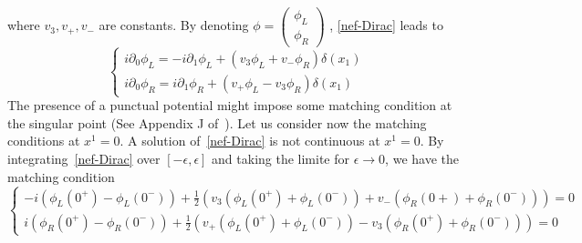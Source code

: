 where $v_3, v_+, v_-$ are constants.
By denoting $\phi =
\begin{pmatrix}
\phi_L \\
\phi_R
\end{pmatrix}$
, \cref{nef-Dirac} leads to
\begin{equation}
\begin{cases}
i \partial_0 \phi_L = -i\partial_1 \phi_L + (v_3 \phi_L + v_- \phi_R) \delta(x_1) \\
i \partial_0 \phi_R = i\partial_1 \phi_R + (v_+ \phi_L - v_3 \phi_R) \delta(x_1)
\end{cases}
\end{equation}
The presence of a punctual potential might impose some matching condition at the singular point (See \eg Appendix J of~\cite{albeverio1988solvable}).
Let us consider now the matching conditions at $x^1=0$.
A solution of~\cref{nef-Dirac} is not continuous at $x^1 = 0$. 
By integrating~\cref{nef-Dirac} over $[-\epsilon, \epsilon]$ and taking the limite for $\epsilon \rightarrow 0$,
we have the matching condition
\begin{equation}\label{nef-matching}
\begin{cases}
-i(\phi_L(0^+) - \phi_L(0^-)) + \frac{1}{2}(v_3 (\phi_L(0^+) + \phi_L(0^-))+ v_- (\phi_R(0+) + \phi_R(0^-))) = 0 \\
i(\phi_R(0^+) - \phi_R(0^-)) + \frac{1}{2}(v_+ (\phi_L(0^+) + \phi_L(0^-)) - v_3 (\phi_R(0^+) + \phi_R(0^-))) = 0
\end{cases}
\end{equation}
